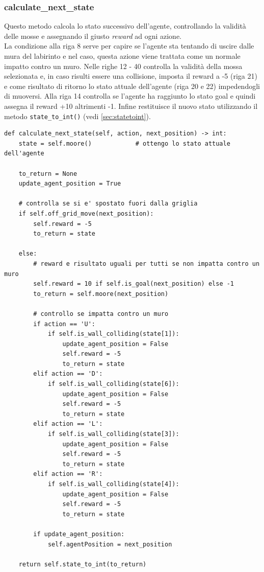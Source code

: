 \subsubsection{calculate\_next\_state}
Questo metodo calcola lo stato successivo dell'agente, controllando la validit\`{a} delle mosse e assegnando il giusto \textit{reward} ad ogni azione.\\
La condizione alla riga 8 serve per capire se l'agente sta tentando di uscire dalle mura del labirinto e nel caso, questa azione viene trattata come un normale impatto contro un muro. Nelle righe 12 - 40 controlla la validit\`{a} della mossa selezionata e, in caso risulti essere una collisione, imposta il reward a -5 (riga 21) e come risultato di ritorno lo stato attuale dell'agente (riga 20 e 22) impedendogli di muoversi. Alla riga 14 controlla se l'agente ha raggiunto lo stato goal e quindi assegna il reward +10 altrimenti -1.
Infine restituisce il nuovo stato utilizzando il metodo \lstinline[style=cmd]|state_to_int()| (vedi \autoref{sec:statetoint}).\\

\begin{lstlisting}[style=python, caption={Codice del metodo calculate\_next\_state}]
def calculate_next_state(self, action, next_position) -> int:
	state = self.moore()            # ottengo lo stato attuale dell'agente

	to_return = None 
	update_agent_position = True 

	# controlla se si e' spostato fuori dalla griglia
	if self.off_grid_move(next_position):
		self.reward = -5
		to_return = state

	else:
		# reward e risultato uguali per tutti se non impatta contro un muro
		self.reward = 10 if self.is_goal(next_position) else -1
		to_return = self.moore(next_position)

		# controllo se impatta contro un muro
		if action == 'U':
			if self.is_wall_colliding(state[1]):
				update_agent_position = False
				self.reward = -5
				to_return = state
		elif action == 'D':
			if self.is_wall_colliding(state[6]):
				update_agent_position = False
				self.reward = -5
				to_return = state
		elif action == 'L':
			if self.is_wall_colliding(state[3]):
				update_agent_position = False
				self.reward = -5
				to_return = state
		elif action == 'R':
			if self.is_wall_colliding(state[4]):
				update_agent_position = False
				self.reward = -5
				to_return = state

		if update_agent_position:
			self.agentPosition = next_position

	return self.state_to_int(to_return)
\end{lstlisting}

